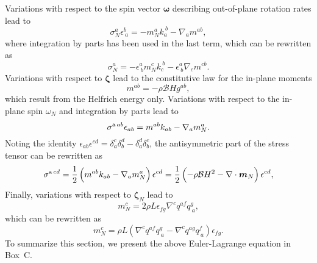 Variations with respect to the spin vector $\bm{\omega}$ describing out-of-plane rotation rates lead to  %
\begin{equation} \label{75_II}
	\sigma_{N}^a \epsilon^b_{~a} = -m_N^{a} k^{~b}_{a} -\nabla_a m^{ab},
\end{equation}
where integration by parts has been used in the last term, which can be rewritten as 
\begin{equation} \label{75_III}
	\sigma_{N}^a  =- \epsilon^a_{~b} m_N^{c} k^{~b}_{c} - \epsilon^a_{~b}\nabla_c m^{cb}.
\end{equation}
Variations with respect to $\bm{\zeta}$ lead to the constitutive law for the in-plane moments
\begin{equation} \label{64_II}
	m^{ab} = -\rho\mathcal{B} Hg^{ab},
\end{equation}
which result from the Helfrich energy only. 
Variations with respect to the in-plane spin $\omega_N$ and integration by parts lead to
\begin{equation}
	\sigma^{\textup{a} \, ab } \epsilon_{ab} = m^{ab} k_{ab} - \nabla_a m_N^a.
\end{equation}
Noting the identity $\epsilon_{ab}\epsilon^{cd} = \delta_a^c \delta_b^d - \delta_a^d \delta_b^c$, the antisymmetric part of the stress tensor  can be rewritten as 
\begin{equation}  \label{66_II}
	\sigma^{\textup{a} \, cd } = \frac{1}{2}\left(m^{ab} k_{ab} - \nabla_a m_N^a\right)\epsilon^{cd} = \frac{1}{2}\left( -\rho\mathcal{B} H^2 - \nabla\cdot \bm{m}_N\right)\epsilon^{cd},
\end{equation}
Finally, variations with respect to $\bm{\zeta}_N$ lead to %
\begin{equation}   \label{67_II}
	m_{N}^c=  2\rho L \epsilon_{fg} \nabla^c q^{af} q^g_{~a},
\end{equation}
which can be rewritten as %
\begin{equation}   \label{68_II}
	m_{N}^c= \rho L \left(\nabla^c q^{af} q_{~a}^g  - \nabla^c q^{ag} q_{~a}^f   \right)\epsilon_{fg}.
\end{equation}
To summarize this section, we present the above Euler-Lagrange equation in Box~C.

